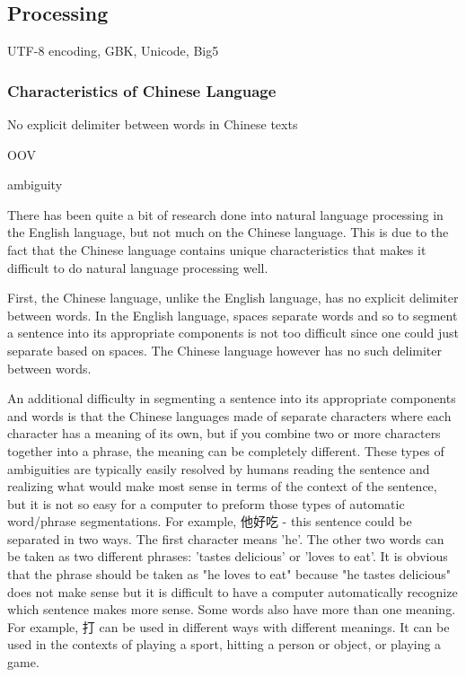 \documentclass[11pt]{article}
\newcommand{\1}[1]{{\mathbf 1}\left\{#1\right\}}        %
\begin{document}
\subsection{Processing}



UTF-8 encoding, GBK, Unicode, Big5

\subsubsection{Characteristics of Chinese Language}\label{subsec:Chinese}
No explicit delimiter between words in Chinese texts

OOV

ambiguity 


\cite{wong2009introduction}


There has been quite a bit of research done into natural language processing in the English language, but not much on the Chinese language.  This is due to the fact that the Chinese language contains unique characteristics that makes it difficult to do natural language processing well. 
 
First, the Chinese language, unlike the English language, has no explicit delimiter between words. In the English language, spaces separate words and so to segment a sentence into its appropriate components is not too difficult since one could just separate based on spaces.  The Chinese language however has no such delimiter between words.
 
An additional difficulty in segmenting a sentence into its appropriate components and words is that the Chinese languages made of separate characters where each character has a meaning of its own, but if you combine two or more characters together into a phrase, the meaning can be completely different. These types of ambiguities are typically easily resolved by humans reading the sentence and realizing what would make most sense in terms of the context of the
sentence, but it is not so easy for a computer to preform those types of automatic word/phrase segmentations. For example, 他好吃 - this sentence could be separated in two ways. The first character means 'he'. The other two words can be taken as two different phrases: 'tastes delicious' or 'loves to eat'.  It is obvious that the phrase should be taken as "he loves to eat" because "he tastes delicious" does not make sense but it is difficult to have a computer
automatically recognize which sentence makes more sense. Some words also have more than one meaning. For example, 打 can be used in different ways with different meanings. It can be used in the contexts of playing a sport, hitting a person or object, or playing a game. 
\end{document}

